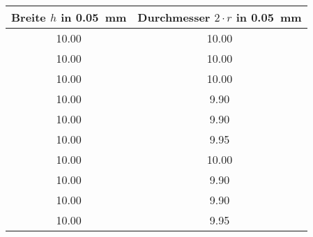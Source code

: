 \begin{center}
\begin{tabular}{c|c}
	Breite $h$ in \SI{0.05}{\milli\metre}& Durchmesser $2 \cdot r$ in \SI{0.05}{\milli\metre}	\\
	\hline
	10.00 & 10.00 \\
	10.00  & 10.00 \\
	10.00  & 10.00 \\
	10.00  & 9.90 \\
	10.00  & 9.90 \\
	10.00  & 9.95 \\
	10.00  & 10.00 \\
	10.00  & 9.90 \\
	10.00  & 9.90 \\
	10.00 & 9.95 \\
\end{tabular}	
\end{center}